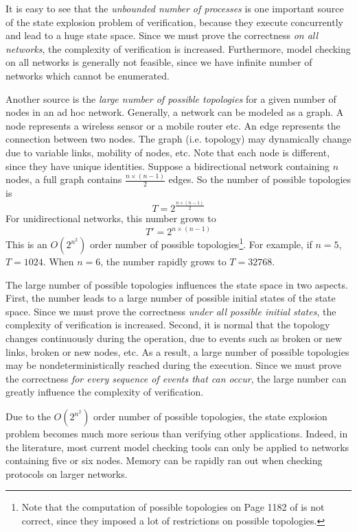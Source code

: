 \documentclass[a4paper,10pt,twocolumn]{article}
\begin{document}
It is easy to see that the \emph{unbounded number of processes} is one important source of the state explosion problem of verification, because they execute concurrently and lead to a huge state space. Since we must prove the correctness \emph{on all networks}, the complexity of verification is increased. Furthermore, model checking on all networks is generally not feasible, since we have infinite number of networks which cannot be enumerated.

Another source is the \emph{large number of possible topologies} for a given number of nodes in an ad hoc network. Generally, a network can be modeled as a graph. A node represents a wireless sensor or a mobile router etc. An edge represents the connection between two nodes. The graph (i.e. topology) may dynamically change due to variable links, mobility of nodes, etc. Note that each node is different, since they have unique identities. Suppose a bidirectional network containing $n$ nodes, a full graph contains $\frac{n \times (n-1)}{2}$ edges. So the number of possible topologies is
$$T = 2^\frac{n \times (n-1)}{2}$$
For unidirectional networks, this number grows to
$$T' = 2^{n \times (n-1)}$$
This is an $O(2^{n^2})$ order number of possible topologies\footnote{Note that the computation of possible topologies on Page 1182 of \cite{RA04} is not correct, since they imposed a lot of restrictions on possible topologies.}. For example, if $n=5$, $T = 1024$. When $n=6$, the number rapidly grows to $T = 32768$.

The large number of possible topologies influences the state space in two aspects. First, the number leads to a large number of possible initial states of the state space. Since we must prove the correctness \emph{under all possible initial states}, the complexity of verification is increased. Second, it is normal that the topology changes continuously during the operation, due to events such as broken or new links, broken or new nodes, etc. As a result, a large number of possible topologies may be nondeterministically reached during the execution. Since we must prove the correctness \emph{for every sequence of events that can occur}, the large number can greatly influence the complexity of verification.

Due to the $O(2^{n^2})$ order number of possible topologies, the state explosion problem becomes much more serious than verifying other applications. Indeed, in the literature, most current model checking tools can only be applied to networks containing five or six nodes. Memory can be rapidly ran out when checking protocols on larger networks.
\end{document}

